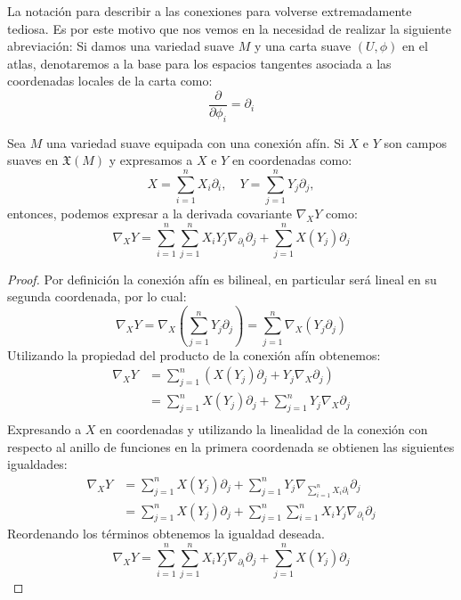 La notación para describir a las conexiones para volverse extremadamente tediosa. Es por este motivo que nos vemos en la necesidad de realizar la siguiente abreviación: Si damos una variedad suave $M$ y una carta suave $(U,\phi)$ en el atlas, denotaremos a la base para los espacios tangentes asociada a las coordenadas locales de la carta como:
\[
	\frac{\partial}{\partial \phi_{i}} = \partial_{i}
\]

\begin{lemma}\label{Lema: Conexión Afín en Coordenadas}
	Sea $M$ una variedad suave equipada con una conexión afín. Si $X$ e $Y$ son campos suaves en $\mathfrak{X}(M)$ y expresamos a $X$ e $Y$ en coordenadas como:
	\[
		X = \sum_{i=1}^{n} X_{i}\partial_{i}, \quad
		Y = \sum_{j=1}^{n} Y_{j}\partial_{j},
	\]
	entonces, podemos expresar a la derivada covariante $\nabla_{X}Y$ como:
	\[
		\nabla_{X}Y = \sum_{i=1}^{n}\sum_{j=1}^{n} X_{i}Y_{j}\nabla_{\partial_{i}}\partial_{j}
		+ \sum_{j=1}^{n} X(Y_{j})\partial_{j}
	\]
\end{lemma}

\begin{proof}
	Por definición la conexión afín es bilineal, en particular será lineal en su segunda coordenada, por lo cual:
	\[
		\nabla_{X}Y = \nabla_{X} \left( \sum_{j=1}^{n} Y_{j} \partial_{j}\right)
		= \sum_{j=1}^{n} \nabla_{X} (Y_{j} \partial_{j})
	\]
	Utilizando la propiedad del producto de la conexión afín obtenemos:
	\begin{align*}
		\nabla_{X}Y & = \sum_{j=1}^{n} (X(Y_{j}) \partial_{j} + Y_{j} \nabla_{X}\partial_{j})              \\
		            & = \sum_{j=1}^{n} X(Y_{j}) \partial_{j} + \sum_{j=1}^{n} Y_{j} \nabla_{X}\partial_{j} \\
	\end{align*}
	Expresando a $X$ en coordenadas y utilizando la linealidad de la conexión con respecto al anillo de funciones en la primera coordenada se obtienen las siguientes igualdades:
	\begin{align*}
		\nabla_{X}Y
		 & = \sum_{j=1}^{n} X(Y_{j})\partial_{j} + \sum_{j=1}^{n} Y_{j} \nabla_{\sum_{i=1}^{n} X_{i}\partial_{i}}\partial_{j} \\
		 & = \sum_{j=1}^{n}X(Y_{j})\partial_{j} + \sum_{j=1}^{n}\sum_{i=1}^{n} X_{i}Y_{j} \nabla_{\partial_{i}}\partial_{j}
	\end{align*}
	Reordenando los términos obtenemos la igualdad deseada.
	\[
		\nabla_{X}Y = \sum_{i=1}^{n}\sum_{j=1}^{n} X_{i}Y_{j}\nabla_{\partial_{i}}\partial_{j}
		+ \sum_{j=1}^{n} X(Y_{j})\partial_{j}
	\]
\end{proof}

